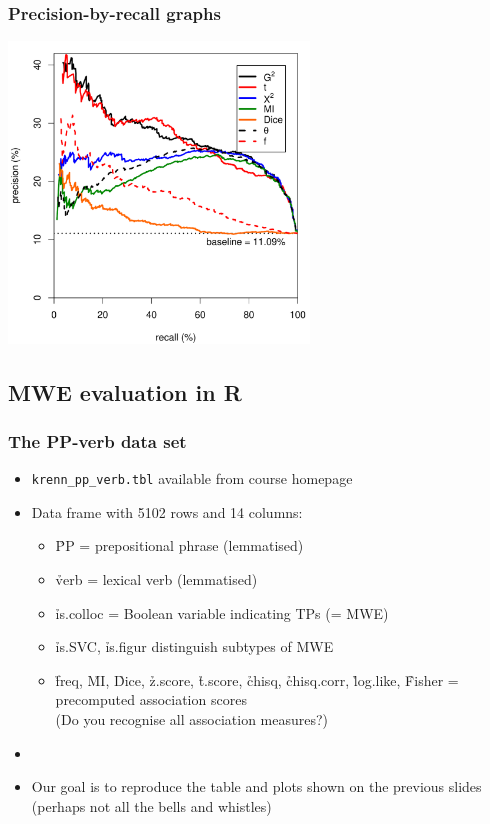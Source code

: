 \documentclass[handout,notes=show,t]{beamer} %
\begin{document}
\begin{frame}
  \frametitle{Precision-by-recall graphs}

  \begin{center}
    \includegraphics[width=8cm]{img/mwe_eval_3}
  \end{center}
\end{frame}

\subsection{MWE evaluation in R}

\begin{frame}[fragile]
  \frametitle{The PP-verb data set}

  \begin{itemize}
  \item \verb|krenn_pp_verb.tbl| available from course homepage
  \item Data frame with 5102 rows and 14 columns:
    \begin{itemize}
    \item \h{PP} = prepositional phrase (lemmatised)
    \item \h{verb} = lexical verb (lemmatised)
    \item \h{is.colloc} = Boolean variable indicating TPs (= MWE)
    \item \h{is.SVC}, \h{is.figur} distinguish subtypes of MWE
    \item \h{freq}, \h{MI}, \h{Dice}, \h{z.score}, \h{t.score}, \h{chisq},
      \h{chisq.corr}, \h{log.like}, \h{Fisher} = precomputed association
      scores\\ (Do you recognise all association measures?)
    \end{itemize}
  \item[]
  \item Our goal is to reproduce the table and plots shown on the previous
    slides (perhaps not all the bells and whistles)
  \end{itemize}
\end{frame}
\end{document}
